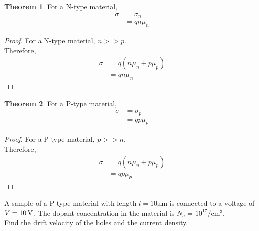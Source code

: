 \documentclass[titlepage, fleqn, a4paper, 12pt, twoside]{article}
\theoremstyle{definition}
\theoremstyle{theorem}
\newtheorem{theorem}{Theorem}
\begin{document}
\begin{theorem}
	For a N-type material,
	\begin{align*}
		\sigma &= \sigma_n\\
		&= q n \mu_n
	\end{align*}
\end{theorem}

\begin{proof}
	For a N-type material, $n >> p$.\\
	Therefore,
	\begin{align*}
		\sigma &= q (n \mu_n + p \mu_p)\\
		&= q n \mu_n
	\end{align*}
\end{proof}

\begin{theorem}
	For a P-type material,
	\begin{align*}
		\sigma &= \sigma_p\\
		&= q p \mu_p
	\end{align*}
\end{theorem}

\begin{proof}
	For a P-type material, $p >> n$.\\
	Therefore,
	\begin{align*}
		\sigma &= q (n \mu_n + p \mu_p)\\
		&= q p \mu_p
	\end{align*}
\end{proof}

\begin{question}
	A sample of a P-type material with length $l = 10 \si{\micro\metre}$ is connected to a voltage of $V = 10 \volt$.
	The dopant concentration in the material is $N_a = 10^{17} \si{\per\centi\metre\cubed}$.\\
	Find the drift velocity of the holes and the current density.
\end{question}
\end{document}
